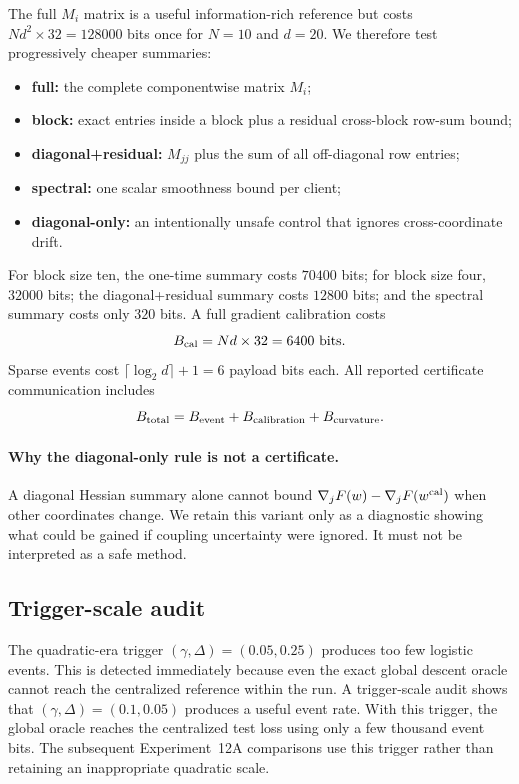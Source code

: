 The full $M_i$ matrix is a useful information-rich reference but costs $Nd^2\times32=128000$ bits once for $N=10$ and $d=20$. We therefore test progressively cheaper summaries:
\begin{itemize}
  \item \textbf{full:} the complete componentwise matrix $M_i$;
  \item \textbf{block:} exact entries inside a block plus a residual cross-block row-sum bound;
  \item \textbf{diagonal+residual:} $M_{jj}$ plus the sum of all off-diagonal row entries;
  \item \textbf{spectral:} one scalar smoothness bound per client;
  \item \textbf{diagonal-only:} an intentionally unsafe control that ignores cross-coordinate drift.
\end{itemize}
For block size ten, the one-time summary costs $70400$ bits; for block size four, $32000$ bits; the diagonal+residual summary costs $12800$ bits; and the spectral summary costs only $320$ bits. A full gradient calibration costs
\begin{equation}
  B_{\rm cal}=Nd\times32=6400\text{ bits}.
\end{equation}
Sparse events cost $\lceil\log_2d\rceil+1=6$ payload bits each. All reported certificate communication includes
\begin{equation}
  B_{\rm total}=B_{\rm event}+B_{\rm calibration}+B_{\rm curvature}.
\end{equation}

\paragraph{Why the diagonal-only rule is not a certificate.}
A diagonal Hessian summary alone cannot bound $\nabla_jF(w)-\nabla_jF(w^{\rm cal})$ when other coordinates change. We retain this variant only as a diagnostic showing what could be gained if coupling uncertainty were ignored. It must not be interpreted as a safe method.

\subsection{Trigger-scale audit}

The quadratic-era trigger $(\gamma,\Delta)=(0.05,0.25)$ produces too few logistic events. This is detected immediately because even the exact global descent oracle cannot reach the centralized reference within the run. A trigger-scale audit shows that $(\gamma,\Delta)=(0.1,0.05)$ produces a useful event rate. With this trigger, the global oracle reaches the centralized test loss using only a few thousand event bits. The subsequent Experiment~12A comparisons use this trigger rather than retaining an inappropriate quadratic scale.

